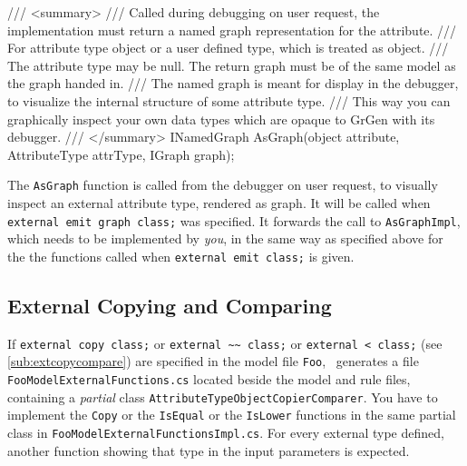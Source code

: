 \begin{csharplet}
/// <summary>
/// Called during debugging on user request, the implementation must return a named graph representation for the attribute.
/// For attribute type object or a user defined type, which is treated as object.
/// The attribute type may be null. The return graph must be of the same model as the graph handed in.
/// The named graph is meant for display in the debugger, to visualize the internal structure of some attribute type.
/// This way you can graphically inspect your own data types which are opaque to GrGen with its debugger.
/// </summary>
INamedGraph AsGraph(object attribute, AttributeType attrType, IGraph graph);
\end{csharplet}

The \texttt{AsGraph} function is called from the debugger on user request, to visually inspect an external attribute type, rendered as graph.
It will be called when \texttt{external emit graph class;} was specified.
It forwards the call to \texttt{AsGraphImpl}, which needs to be implemented by \emph{you}, in the same way as specified above for the the functions called when \texttt{external emit class;} is given.

\subsection*{External Copying and Comparing}\label{sub:apiextcopycompare}

If \texttt{external copy class;} or \texttt{external \textasciitilde\textasciitilde\ class;} or \texttt{external < class;} (see \ref{sub:extcopycompare}) are specified in the model file \texttt{Foo},
\GrG~generates a file \texttt{Foo\-Model\-External\-Functions.cs} located beside the model and rule files,
containing a \emph{partial} class \texttt{Attribute\-Type\-Object\-Copier\-Comparer}.
You have to implement the \texttt{Copy} or the \texttt{IsEqual} or the \texttt{IsLower} functions in the same partial class in \texttt{Foo\-Model\-External\-Functions\-Impl.cs}.
For every external type defined, another function showing that type in the input parameters is expected.

